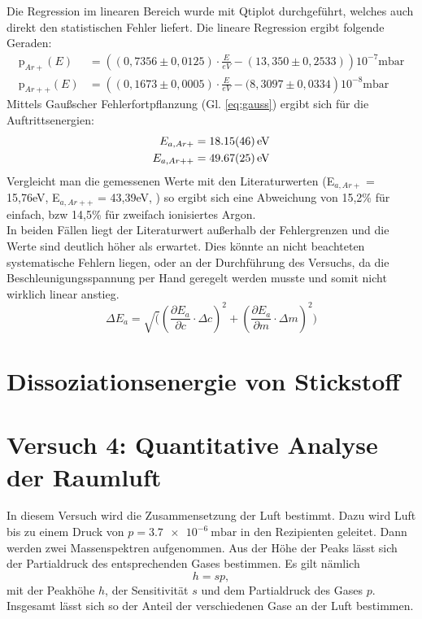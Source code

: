 Die Regression im linearen Bereich wurde mit Qtiplot durchgeführt, welches auch direkt den statistischen Fehler liefert. Die lineare Regression ergibt folgende Geraden:
\begin{align}
	\textrm{p}_{Ar+}(E) &= \left((0,7356\pm 0,0125)\cdot\frac{E}{eV} - (13,350\pm 0,2533)\right)10^{-7}\textrm{mbar}\\
	\textrm{p}_{Ar++}(E) &= \left((0,1673\pm 0,0005)\cdot\frac{E}{eV} - (8,3097\pm 0,0334\right)10^{-8}\textrm{mbar}
\end{align}
Mittels Gaußscher Fehlerfortpflanzung (Gl. \ref{eq:gauss}) ergibt sich für die Auftrittsenergien:
\begin{align}
	E_{a,Ar+} &= \SI{18,15\pm 0,46}{\electronvolt}\\
	E_{a,Ar++} &= \SI{49,67\pm 0,25}{\electronvolt}
\end{align}
Vergleicht man die gemessenen Werte mit den Literaturwerten (E$_{a,Ar+}$ = 15,76\;eV, E$_{a,Ar++}$ = 43,39\;eV, \cite{Litmap}) so ergibt sich eine Abweichung von 15,2\;\% für einfach, bzw 14,5\;\% für zweifach ionisiertes Argon.\\
In beiden Fällen liegt der Literaturwert außerhalb der Fehlergrenzen und die Werte sind deutlich höher als erwartet. Dies könnte an nicht beachteten systematische Fehlern liegen, oder an der Durchführung des Versuchs, da die Beschleunigungsspannung per Hand geregelt werden musste und somit nicht wirklich linear anstieg.\\
\begin{equation}
	\Delta E_a = \sqrt(\left(\frac{\partial E_a}{\partial c}\cdot\Delta c\right)^2 + \left(\frac{\partial E_a}{\partial m}\cdot\Delta m\right)^2)
	\label{eq:gauss}
\end{equation}
\section{Dissoziationsenergie von Stickstoff}



\section{Versuch 4: Quantitative Analyse der Raumluft}

In diesem Versuch wird die Zusammensetzung der Luft bestimmt. Dazu wird Luft bis zu einem Druck von $p=\SI{3,7e-6}{\milli\bar}$ in den Rezipienten geleitet. Dann werden zwei Massenspektren aufgenommen. Aus der Höhe der Peaks lässt sich der Partialdruck des entsprechenden Gases bestimmen. Es gilt nämlich
\begin{equation}
 h = sp,
\end{equation}
mit der Peakhöhe $h$, der Sensitivität $s$ und dem Partialdruck des Gases $p$. Insgesamt lässt sich so der Anteil der verschiedenen Gase an der Luft bestimmen.

